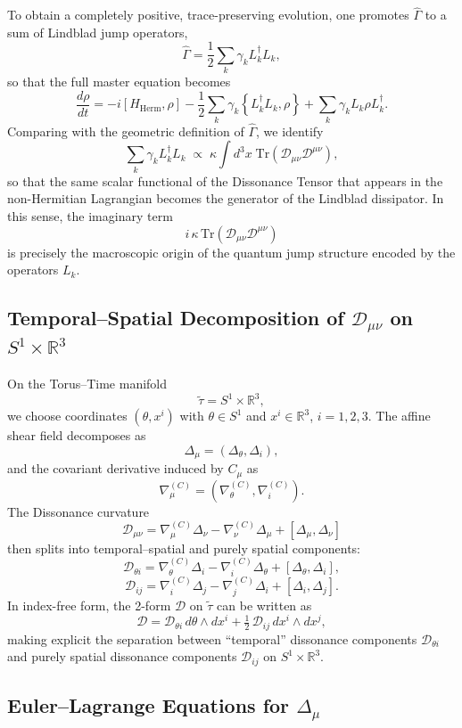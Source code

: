 \documentclass[12pt,openany]{book}
\theoremstyle{plain}
\theoremstyle{definition}
\theoremstyle{remark}
\begin{document}
To obtain a completely positive, trace-preserving evolution, one promotes
$\hat{\Gamma}$ to a sum of Lindblad jump operators,
\[
\hat{\Gamma}
= \frac{1}{2}\sum_k \gamma_k L_k^\dagger L_k,
\]
so that the full master equation becomes
\[
\frac{d\rho}{dt}
= -i[H_{\mathrm{Herm}},\rho]
  - \frac{1}{2}\sum_k \gamma_k
    \left\{L_k^\dagger L_k,\rho\right\}
  + \sum_k \gamma_k L_k \rho L_k^\dagger.
\]
Comparing with the geometric definition of $\hat{\Gamma}$, we identify
\[
\sum_k \gamma_k L_k^\dagger L_k
\;\propto\;
\kappa \int d^3x\;
\mathrm{Tr}\!\left(\mathcal{D}_{\mu\nu}\mathcal{D}^{\mu\nu}\right),
\]
so that the same scalar functional of the Dissonance Tensor that appears in
the non-Hermitian Lagrangian becomes the generator of the Lindblad
dissipator. In this sense, the imaginary term
\[
i\,\kappa\,\mathrm{Tr}\!\left(\mathcal{D}_{\mu\nu}\mathcal{D}^{\mu\nu}\right)
\]
is precisely the macroscopic origin of the quantum jump structure encoded
by the operators $L_k$.

\subsection*{Temporal–Spatial Decomposition of $\mathcal{D}_{\mu\nu}$ on $S^1 \times \mathbb{R}^3$}

On the Torus--Time manifold
\[
\tilde{\tau} = S^1 \times \mathbb{R}^3,
\]
we choose coordinates $(\theta, x^i)$ with $\theta \in S^1$ and
$x^i \in \mathbb{R}^3$, $i = 1,2,3$. The affine shear field decomposes as
\[
\Delta_\mu = (\Delta_\theta, \Delta_i),
\]
and the covariant derivative induced by $C_\mu$ as
\[
\nabla_\mu^{(C)} = (\nabla_\theta^{(C)}, \nabla_i^{(C)}).
\]
The Dissonance curvature
\[
\mathcal{D}_{\mu\nu}
= \nabla_\mu^{(C)} \Delta_\nu
- \nabla_\nu^{(C)} \Delta_\mu
+ [\Delta_\mu,\Delta_\nu]
\]
then splits into temporal–spatial and purely spatial components:
\[
\mathcal{D}_{\theta i}
= \nabla_\theta^{(C)} \Delta_i
- \nabla_i^{(C)} \Delta_\theta
+ [\Delta_\theta,\Delta_i],
\]
\[
\mathcal{D}_{ij}
= \nabla_i^{(C)} \Delta_j
- \nabla_j^{(C)} \Delta_i
+ [\Delta_i,\Delta_j].
\]
In index-free form, the 2-form $\mathcal{D}$ on $\tilde{\tau}$ can be
written as
\[
\mathcal{D}
= \mathcal{D}_{\theta i}\, d\theta \wedge dx^i
+ \tfrac{1}{2}\,\mathcal{D}_{ij}\, dx^i \wedge dx^j,
\]
making explicit the separation between ``temporal'' dissonance components
$\mathcal{D}_{\theta i}$ and purely spatial dissonance components
$\mathcal{D}_{ij}$ on $S^1 \times \mathbb{R}^3$.

\subsection*{Euler--Lagrange Equations for $\Delta_\mu$}
\end{document}
